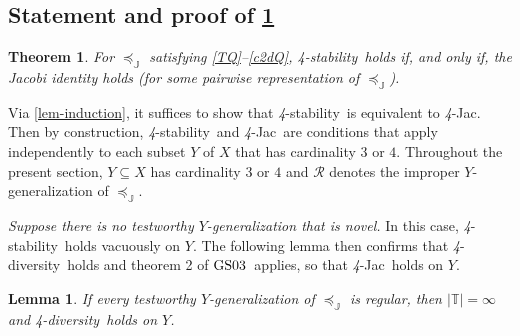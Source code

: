 \documentclass[ecta,nameyear,draft]{econsocart}
\makeatletter
\newcommand{\mbb}{\mathbb}
\newcommand{\mc}{\mathcal}
\newcommand\mplus{\text{\srcsize$+$}}
\newcommand{\ext}{\mathrel{\mc R}}
\newcommand{\mbbc}{{\mathds C}}
\newcommand{\mbbt}{{\mathds {T}}}
\newcommand{\mbbj}{\mathds J}
\newcommand{\stability}{\textit{4}-\textup{{stability}}}
\newcommand{\fourdiv}{\textit{4}-\textup{diversity}}
\newcommand{\fourjac}{\textup{\textit{4}-Jac}}
\newcommand{\srcsize}{\@setfontsize{\srcsize}{3pt}{3pt}}
\newcommand{\gsii}{$\textup{GS03}$}
\theoremstyle{plain}
\newtheorem{theorem}{Theorem}%
\newtheorem{lemma}{Lemma}[theorem]
\theoremstyle{remark}
\makeatother
\begin{document}
\begin{appendix}
  \section{Statement and proof of \cref{thm-foureq}}\label{sec-proof-foureq}
  \begin{theorem}\label{thm-foureq} For $\preceq_{\mbbj}$ satisfying
    \ref{TQ}--\ref{c2dQ}, \stability\ holds if, and only if, the Jacobi
    identity holds (for some pairwise representation of $\preceq_{\mbbj}$).
  \end{theorem}
  Via \cref{lem-induction}, it suffices to show that \stability\ is equivalent
  to \fourjac. Then by construction, \stability\ and \fourjac\ are conditions
  that apply independently to each subset $Y$ of $X$ that has cardinality $3$
  or $4$.  Throughout the present section, $Y\subseteq X$ has cardinality $3$
  or $4$ and $\ext$ denotes the improper $Y$-{generalization} of
  $\preceq_{\mbbj}$.

  \emph{Suppose there is no testworthy $Y$-{generalization} that is
  novel.} In this case, \stability\ holds vacuously on $Y$. The
  following lemma then confirms that \fourdiv\ holds and theorem 2 of \gsii\
  applies, so that \fourjac\ holds on $Y$.
  \begin{lemma}\label{lem-test-empty-fourdiv} If every testworthy
    $Y$-{generalization} of $\preceq_{\mbbj}$ is regular, then $\lvert \mbbt
    \rvert = \infty$ and \fourdiv\ holds on $Y$.
  \end{lemma}


\end{appendix}
\end{document}

